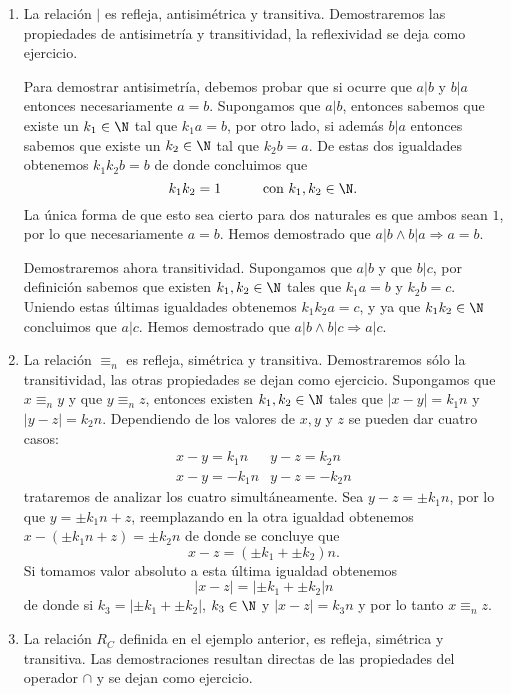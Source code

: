 \begin{ejemplo}
\begin{enumerate}
  \itemsep 0pt
  \item La relación $|$ es refleja, antisimétrica y transitiva.
  Demostraremos las propiedades de antisimetría y transitividad, la reflexividad se deja como ejercicio.
  
  Para demostrar antisimetría, debemos probar que si ocurre que $a|b$ y $b|a$ entonces necesariamente $a=b$.
  Supongamos que $a|b$, entonces sabemos que existe un $k_1\in\N$ tal que $k_1a=b$, por otro lado, si además $b|a$ entonces sabemos que existe un $k_2\in\N$ tal que $k_2b=a$.
  De estas dos igualdades obtenemos $k_1k_2b=b$ de donde concluimos que
  \[
  k_1k_2=1\hspace*{3em}\text{con }k_1,k_2\in\N.
  \]
  La única forma de que esto sea cierto para dos naturales es que ambos sean $1$, por lo que necesariamente $a=b$.
  Hemos demostrado que $a|b\wedge b|a\Rightarrow a=b$.
  
  Demostraremos ahora transitividad.
  Supongamos que $a|b$ y que $b|c$, por definición sabemos que existen $k_1,k_2\in\N$ tales que $k_1a=b$ y $k_2b=c$.
  Uniendo estas últimas igualdades obtenemos $k_1k_2a=c$, y ya que $k_1k_2\in\N$ concluimos que $a|c$.
  Hemos demostrado que $a|b\wedge b|c\Rightarrow a|c$.
  
  \item 
 	La relación $\equiv_n$ es refleja, simétrica y transitiva.
 	Demostraremos sólo la transitividad, las otras propiedades se dejan como ejercicio.
 	Supongamos que $x\equiv_ny$ y que $y\equiv_nz$, entonces existen $k_1,k_2\in\N$ tales que $|x-y|=k_1n$ y $|y-z|=k_2n$.
 	Dependiendo de los valores de $x,y$ y $z$ se pueden dar cuatro casos:
 	\[
 	\begin{array}{rr}
 	x-y=k_1n & y-z=k_2n \\
 	x-y=-k_1n & y-z=-k_2n
 	\end{array}
 	\]
 	trataremos de analizar los cuatro simultáneamente.
 	Sea $y-z=\pm k_1n$, por lo que $y=\pm k_1n+z$, reemplazando en la otra igualdad obtenemos $x-(\pm k_1n+z)=\pm k_2n$ de donde se concluye que 
 	\[
 	x-z=(\pm k_1+\pm k_2)n. 
 	\]
 	Si tomamos valor absoluto a esta última igualdad obtenemos
 	\[
 	|x-z|=|\pm k_1+\pm k_2|n
 	\]
 	de donde si $k_3=|\pm k_1+\pm k_2|$, $k_3\in\N$ y $|x-z|=k_3n$ y por lo tanto $x\equiv_nz$.
 	
 	\item La relación $R_C$ definida en el ejemplo anterior, es refleja, simétrica y transitiva.
 	Las demostraciones resultan directas de las propiedades del operador $\cap$ y se dejan como ejercicio.
\end{enumerate}
\end{ejemplo}

